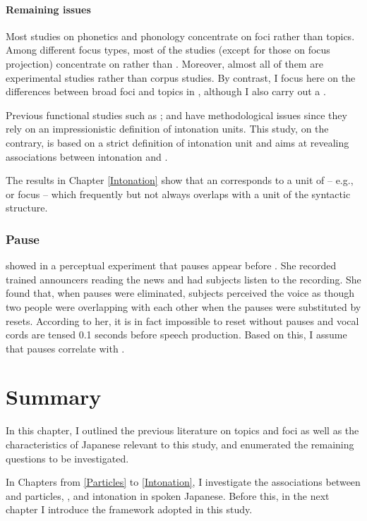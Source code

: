 \paragraph{Remaining issues}

Most studies on phonetics and phonology concentrate on
foci rather than topics.
Among different focus types, most of the studies (except for those on focus projection) concentrate on  rather than .
Moreover, almost all of them are experimental studies rather than
corpus studies.
By contrast, I focus here on
the differences between broad foci and topics in ,
although I also carry out a .

Previous functional studies such as ; and 
have methodological issues since they rely on an impressionistic definition of intonation units.
This study, on the contrary, is based on a
strict definition of intonation unit and
aims at revealing associations between intonation and .

The results in Chapter \ref{Intonation} show that
an  corresponds to a unit of  -- e.g.,  or focus --
which frequently but not always overlaps with a unit of the syntactic structure.

\subsubsection{Pause}

 showed in a perceptual experiment that
pauses appear before . %
She recorded trained announcers reading the news and had subjects listen to the recording.
She found that, when pauses were eliminated,
subjects perceived the voice as though two people were overlapping with each other when the pauses were substituted by  resets.
According to her,
it is in fact impossible to reset  without pauses and
vocal cords are tensed 0.1 seconds before speech production.
Based on this, I assume that pauses correlate with .

\section{Summary}

In this chapter,
I outlined the previous literature on topics and foci as well as the characteristics of Japanese relevant to this study,
and enumerated the remaining questions to be investigated.

In Chapters from \ref{Particles} to \ref{Intonation},
I investigate the associations between  and particles, , and intonation in spoken Japanese.
Before this, in the next chapter I introduce the framework adopted in this study.





